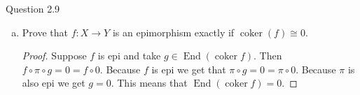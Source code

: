 \documentclass{article}
\DeclareMathOperator{\coker}{coker}
\DeclareMathOperator{\End}{End}
\newcommand{\cat}{\mathcal{C}}
\newenvironment{question}[1][]{\begin{paragraph}{Question #1}}{\end{paragraph}}
\theoremstyle{definition}
\begin{document}
\begin{question}[2.9]
\begin{enumerate}[a)]
\begin{proof}
                  Now suppose the kernel is trivial and there are two maps
                  \(g,h:Z\to X\) such that \(fg=fh\). Because \(\cat\) is
                  preabelian we have \(f(g-h)=0\). This means that there is some
                  map \(\overline{g-h}:Z\to\ker f=0\) such that the following
                  diagram commutes:
                  \begin{figure}[H]
                      \[
                          \begin{tikzcd}
                              Z && X && Y \\
                              \\
                              && 0
                              \arrow["0"', from=3-3, to=1-5]
                              \arrow["0"', hook, from=3-3, to=1-3]
                              \arrow["f"', from=1-3, to=1-5]
                              \arrow["{g-h}"', from=1-1, to=1-3]
                              \arrow["{\overline{g-h}}"', from=1-1, to=3-3]
                          \end{tikzcd}
                      \]
                      \caption{Yet another commutative diagram.}
                      \label{fig:ker-zero-f-mono}
                  \end{figure}
                  The map \(\overline{g-h}\) must be the \(0\) map because \(0\)
                  is terminal. Therefore \(g-h=0\circ0=0\) so \(g=h\) and \(f\)
                  is monomorphic.
              \end{proof}
        \item Prove that \(f:X\to Y\) is an epimorphism exactly if \(\coker(f)\cong0\).

              \begin{proof}
                  Suppose \(f\) is epi and take \(g\in\End(\coker f)\). Then
                  \(f\circ\pi\circ g=0=f\circ 0\). Because \(f\) is epi we get
                  that \(\pi\circ g=0=\pi\circ 0\). Because \(\pi\) is also epi
                  we get \(g=0\). This means that \(\End(\coker f)=0\).


\end{proof}
\end{enumerate}
\end{question}
\end{document}
